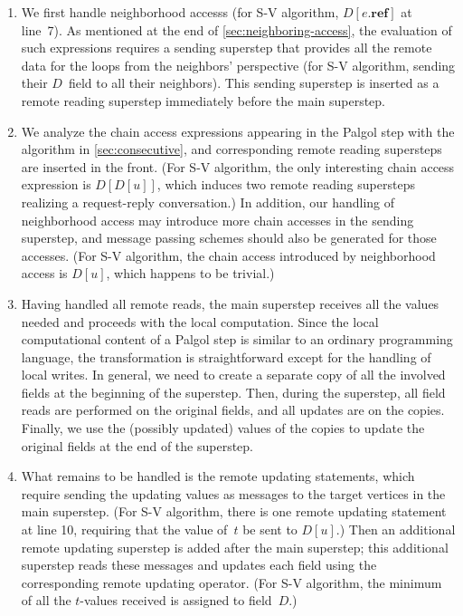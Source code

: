 \documentclass{sokendai_thesis} %
\begin{document}
\begin{enumerate}
\item We first handle neighborhood accesss (for S-V algorithm, $D[e.\mathbf{ref}]$ at line~7).
As mentioned at the end of \autoref{sec:neighboring-access}, the evaluation of such expressions requires a sending superstep that provides all the remote data for the loops from the neighbors' perspective (for S-V algorithm, sending their $D$~field to all their neighbors).
This sending superstep is inserted as a remote reading superstep immediately before the main superstep.

\item We analyze the chain access expressions appearing in the Palgol step with the algorithm in \autoref{sec:consecutive}, and corresponding remote reading supersteps are inserted in the front.
(For S-V algorithm, the only interesting chain access expression is $D[D[u]]$, which induces two remote reading supersteps realizing a request-reply conversation.)
In addition, our handling of neighborhood access may introduce more chain accesses in the sending superstep, and message passing schemes should also be generated for those accesses.
(For S-V algorithm, the chain access introduced by neighborhood access is $D[u]$, which happens to be trivial.)

\item Having handled all remote reads, the main superstep receives all the values needed and proceeds with the local computation.
Since the local computational content of a Palgol step is similar to an ordinary programming language, the transformation is straightforward except for the handling of local writes.
In general, we need to create a separate copy of all the involved fields at the beginning of the superstep.
Then, during the superstep, all field reads are performed on the original fields, and all updates are on the copies.
Finally, we use the (possibly updated) values of the copies to update the original fields at the end of the superstep.

\item What remains to be handled is the remote updating statements, which require sending the updating values as messages to the target vertices in the main superstep.
(For S-V algorithm, there is one remote updating statement at line 10, requiring that the value of~$t$ be sent to $D[u]$.)
Then an additional remote updating superstep is added after the main superstep; this additional superstep reads these messages and updates each field using the corresponding remote updating operator.
(For S-V algorithm, the minimum of all the $t$-values received is assigned to field~$D$.)

\end{enumerate}
\end{document}
